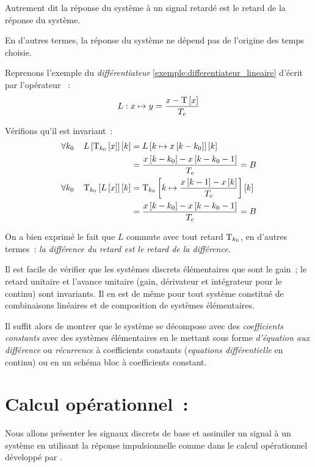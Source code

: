 Autrement dit \og{} la réponse du système à un signal retardé est le
retard de la réponse du système.\fg{} 

En d'autres termes, la réponse du système ne dépend pas de l'origine
des temps choisie.

\begin{exemple}
  Reprenons l'exemple du \emph{différentiateur} \ref{exemple:differentiateur_lineaire} d'écrit par l'opérateur ~: $$L : x \mapsto y=\frac{x-\mathrm{T}\left[x\right]}{T_e}$$
  
  Vérifions qu'il est invariant~:
  \begin{eqnarray*}
    \forall k_0 \;\;\;\; L\left[\mathrm{T}_{k_0}\left[x\right]\right]\left[k\right] &= L\left[k\mapsto x\left[k-k_0\right]\right]\left[k\right]\\
                                                   &= \frac{x\left[k-k_0\right]-x\left[k-k_0-1\right]}{T_e} = B\\
    \forall k_0 \;\;\;\; \mathrm{T}_{k_0}\left[L\left[x\right]\right]\left[k\right] &= \mathrm{T}_{k_0}\left[k\mapsto \frac{x\left[k-1\right]-x\left[k\right]}{T_e}\right]\left[k\right]\\
                                                   &= \frac{x\left[k-k_0\right]-x\left[k-k_0-1\right]}{T_e} = B
  \end{eqnarray*}
  
  On a bien exprimé le fait que $L$ commute avec tout retard
  $\mathrm{T}_{k_0}$, en d'autres termes~: \emph{la différence du retard est le retard de la différence.}
\end{exemple}


\begin{remarque}
  Il est facile de vérifier que les systèmes discrets élémentaires que
  sont le gain~; le retard unitaire et l'avance unitaire (gain,
  dérivateur et intégrateur pour le continu) sont invariants.  Il en
  est de même pour tout système constitué de combinaisons linéaires
  et de composition de systèmes élémentaires.
  
  Il suffit alors de montrer que le système se décompose avec des
  \emph{coefficients constants} avec des systèmes élémentaires en le
  mettant sous forme \emph{d'équation aux différence} ou
  \emph{récurrence} à coefficients constants (\emph{equations
    différentielle} en continu) ou en un schéma bloc à coefficients
  constant.
\end{remarque}

\section{Calcul opérationnel~: \teZ{}}

Nous allons présenter les signaux discrets de base et assimiler un
signal à un système en utilisant la réponse impulsionnelle comme dans
le calcul opérationnel développé par \Heaviside.

